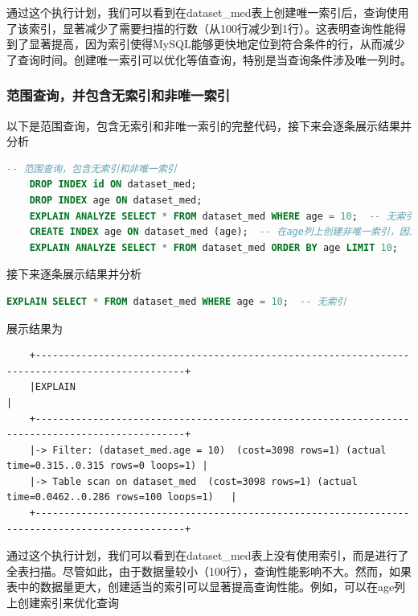 \documentclass{article}
\begin{document}
	通过这个执行计划，我们可以看到在dataset\_med表上创建唯一索引后，查询使用了该索引，显著减少了需要扫描的行数（从100行减少到1行）。这表明查询性能得到了显著提高，因为索引使得MySQL能够更快地定位到符合条件的行，从而减少了查询时间。创建唯一索引可以优化等值查询，特别是当查询条件涉及唯一列时。
	
	\subsubsection{范围查询，并包含无索引和非唯一索引}
	
	以下是范围查询，包含无索引和非唯一索引的完整代码，接下来会逐条展示结果并分析
	
	\begin{lstlisting}[language=sql, title=范围查询，包含无索引和非唯一索引, tabsize=4]
	-- 范围查询，包含无索引和非唯一索引
	DROP INDEX id ON dataset_med;
	DROP INDEX age ON dataset_med;
	EXPLAIN ANALYZE SELECT * FROM dataset_med WHERE age = 10;  -- 无索引
	CREATE INDEX age ON dataset_med (age);  -- 在age列上创建非唯一索引，因为age列中可能存在重复值。
	EXPLAIN ANALYZE SELECT * FROM dataset_med ORDER BY age LIMIT 10;  -- 非唯一索引
	\end{lstlisting}
	
	接下来逐条展示结果并分析
	
	\begin{lstlisting}[language=sql, title=无索引范围查询, tabsize=4]
	EXPLAIN SELECT * FROM dataset_med WHERE age = 10;  -- 无索引
	\end{lstlisting}
	
	展示结果为
	
	\begin{verbatim}
	+------------------------------------------------------------------------------------------------+
	|EXPLAIN                                                                                         |
	+------------------------------------------------------------------------------------------------+
	|-> Filter: (dataset_med.age = 10)  (cost=3098 rows=1) (actual time=0.315..0.315 rows=0 loops=1) |
	|-> Table scan on dataset_med  (cost=3098 rows=1) (actual time=0.0462..0.286 rows=100 loops=1)   |
	+------------------------------------------------------------------------------------------------+
	\end{verbatim}
	
	通过这个执行计划，我们可以看到在dataset\_med表上没有使用索引，而是进行了全表扫描。尽管如此，由于数据量较小（100行），查询性能影响不大。然而，如果表中的数据量更大，创建适当的索引可以显著提高查询性能。例如，可以在age列上创建索引来优化查询
	
\end{document}
